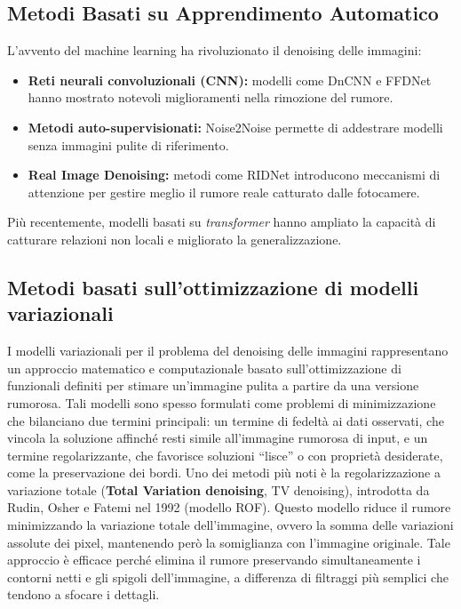 \documentclass[12pt,a4paper,openright,twoside]{book}
\begin{document}
\subsection*{Metodi Basati su Apprendimento Automatico}
L'avvento del machine learning ha rivoluzionato il denoising delle immagini:
\begin{itemize}
    \item \textbf{Reti neurali convoluzionali (CNN):} modelli come DnCNN \parencite{zhang2017dncnn} e FFDNet \parencite{zhang2018ffdnet} hanno mostrato notevoli miglioramenti nella rimozione del rumore.
    \item \textbf{Metodi auto-supervisionati:} Noise2Noise \parencite{lehtinen2018noise2noise} permette di addestrare modelli senza immagini pulite di riferimento.
    \item \textbf{Real Image Denoising:} metodi come RIDNet \parencite{9010324} introducono meccanismi di attenzione per gestire meglio il rumore reale catturato dalle fotocamere.
\end{itemize}
Più recentemente, modelli basati su \emph{transformer} hanno ampliato la capacità di catturare relazioni non locali e migliorato la generalizzazione.

\subsection*{Metodi basati sull'ottimizzazione di modelli variazionali}
I modelli variazionali per il problema del denoising delle immagini rappresentano un approccio matematico e computazionale basato sull'ottimizzazione di funzionali definiti per stimare un'immagine pulita a partire da una versione rumorosa. Tali modelli sono spesso formulati come problemi di minimizzazione che bilanciano due termini principali: un termine di fedeltà ai dati osservati, che vincola la soluzione affinché resti simile all'immagine rumorosa di input, e un termine regolarizzante, che favorisce soluzioni “lisce” o con proprietà desiderate, come la preservazione dei bordi.
\whiteline
Uno dei metodi più noti è la regolarizzazione a variazione totale (\textbf{Total Variation denoising}, TV denoising), introdotta da Rudin, Osher e Fatemi nel 1992 (modello ROF)\parencite{RudinOsherFatemi1992}. Questo modello riduce il rumore minimizzando la variazione totale dell'immagine, ovvero la somma delle variazioni assolute dei pixel, mantenendo però la somiglianza con l'immagine originale. Tale approccio è efficace perché elimina il rumore preservando simultaneamente i contorni netti e gli spigoli dell'immagine, a differenza di filtraggi più semplici che tendono a sfocare i dettagli.
\end{document}
